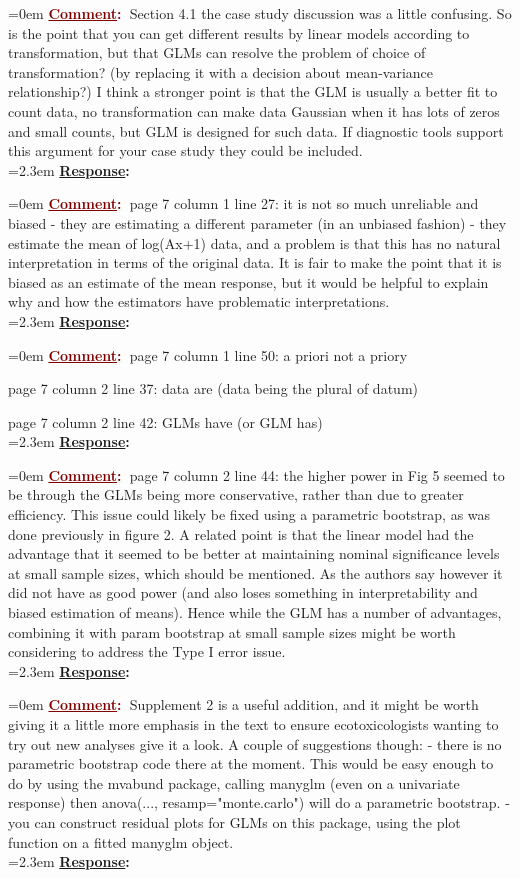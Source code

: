 \documentclass[12pt]{article}
\newcommand{\comment}[0]{\vspace{1em} \noindent \hangindent=0em \textbf{\textcolor{Maroon}{\uline{Comment}:~}}}
\newcommand{\response}[0]{\\\vspace{0.1em} \hangindent=2.3em \textbf{\textcolor{NavyBlue}{\uline{Response}:~}}}
\begin{document}
\comment Section 4.1 the case study discussion was a little confusing.  So is the point that you can get different results by linear models according to transformation, but that GLMs can resolve the problem of choice of transformation?  (by replacing it with a decision about mean-variance relationship?)  I think a stronger point is that the GLM is usually a better fit to count data, no transformation can make data Gaussian when it has lots of zeros and small counts, but GLM is designed for such data.  If diagnostic tools support this argument for your case study they could be included.
\response

\comment page 7 column 1 line 27: it is not so much unreliable and biased - they are estimating a different parameter (in an unbiased fashion) - they estimate the mean of log(Ax+1) data, and a problem is that this has no natural interpretation in terms of the original data.  It is fair to make the point that it is biased as an estimate of the mean response, but it would be helpful to explain why and how the estimators have problematic interpretations.
\response

\comment page 7 column 1 line 50: a priori not a priory

page 7 column 2 line 37: data are (data being the plural of datum)

page 7 column 2 line 42: GLMs have (or GLM has)
\response

\comment page 7 column 2 line 44: the higher power in Fig 5 seemed to be through the GLMs being more conservative, rather than due to greater efficiency.  This issue could likely be fixed using a parametric bootstrap, as was done previously in figure 2.
A related point is that the linear model had the advantage that it seemed to be better at maintaining nominal significance levels at small sample sizes, which should be mentioned.  As the authors say however it did not have as good power (and also loses something in interpretability and biased estimation of means).  Hence while the GLM has a number of advantages, combining it with param bootstrap at small sample sizes might be worth considering to address the Type I error issue.
\response

\comment Supplement 2 is a useful addition, and it might be worth giving it a little more emphasis in the text to ensure ecotoxicologists wanting to try out new analyses give it a look.  A couple of suggestions though:
- there is no parametric bootstrap code there at the moment.  This would be easy enough to do by using the mvabund package, calling manyglm (even on a univariate response) then anova(..., resamp="monte.carlo")  will do a parametric bootstrap.
- you can construct residual plots for GLMs on this package, using the plot function on a fitted manyglm object.
\response
\end{document}
